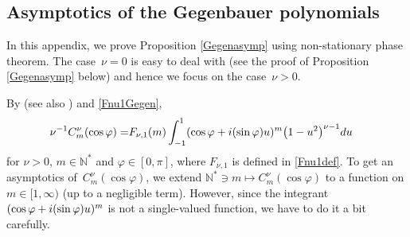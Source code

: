 \documentclass[10pt,a4paper]{article}
\numberwithin{equation}{section}
\def\f{\varphi}
\def\n{\nu}
\begin{document}
\subsection{Asymptotics of the Gegenbauer polynomials}\label{appasymgegensubsec}

In this appendix, we prove Proposition \ref{Gegenasymp} using non-stationary phase theorem. The case~${\n=0}$ is easy to deal with (see the proof of Proposition \ref{Gegenasymp} below) and hence we focus on the case~${\n>0}$.

By \cite[equation~(4.30)]{BKO} (see also \cite[Section 10]{IJ}) and \eqref{Fnu1Gegen},
\begin{align}\label{Gegenintrep}
\n^{-1}C_m^{\n}(\cos\f)=&F_{\n,1}(m)\int_{-1}^{1}(\cos\f+{\rm i}(\sin\f)u)^m\bigl(1-u^2\bigr)^{\n-1}{\rm d}u
\end{align}
for $\n>0$, $m\in\mathbb{N}^*$ and $\f\in [0,\pi]$, where $F_{\n,1}$ is defined in \eqref{Fnu1def}. To get an asymptotics of~$C_m^{\n}(\cos\f)$, we extend $\mathbb{N}^*\ni m\mapsto C_m^{\n}(\cos\f)$ to a function on $m\in [1,\infty)$ (up to a negligible term). However, since the integrant $(\cos\f+{\rm i}(\sin\f)u)^m$ is not a single-valued function, we have to do it a bit carefully.
\end{document}

